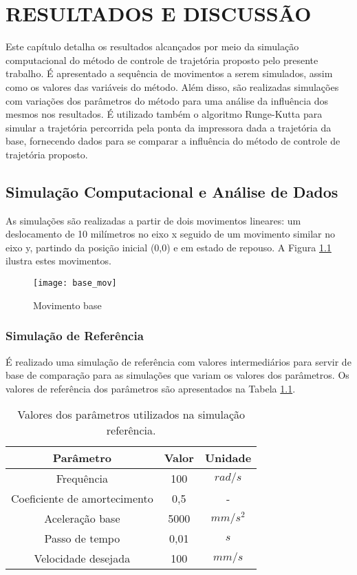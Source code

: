 \chapter{RESULTADOS E DISCUSSÃO}
Este capítulo detalha os resultados alcançados por meio da simulação computacional do método de controle de trajetória proposto pelo presente trabalho. É apresentado a sequência de movimentos a serem simulados, assim como os valores das variáveis do método. Além disso, são realizadas simulações com variações dos parâmetros do método para uma análise da influência dos mesmos nos resultados. É utilizado também o algoritmo Runge-Kutta para simular a trajetória percorrida pela ponta da impressora dada a trajetória da base, fornecendo dados para se comparar a influência do método de controle de trajetória proposto.

\section{Simulação Computacional e Análise de Dados}

As simulações são realizadas a partir de dois movimentos lineares: um deslocamento de 10 milímetros no eixo x seguido de um movimento similar no eixo y, partindo da posição inicial (0,0) e em estado de repouso. A Figura \ref{fig:base_mov} ilustra estes movimentos.

\begin{figure}[H]
    \centering
    \caption{Movimento base}
    \texttt{[image: base\_mov]}

    \label{fig:base_mov}
\end{figure}

\subsection{Simulação de Referência} 
É realizado uma simulação de referência com valores intermediários para servir de base de comparação para as simulações que variam os valores dos parâmetros. Os valores de referência dos parâmetros são apresentados na Tabela \ref{tab:base_params}.

\begin{table}
    \begin{center}
    \caption{Valores dos parâmetros utilizados na simulação referência.}
    \label{tab:base_params}
    \begin{tabular}{c c c}
        Parâmetro & Valor & Unidade\\ \hline
        Frequência & 100 & $rad/s$\\
        Coeficiente de amortecimento & 0,5 & - \\
        Aceleração base & 5000 & $mm/s^2$ \\
        Passo de tempo & 0,01 & $s$ \\ 
        Velocidade desejada & 100 & $mm/s$ \\ \hline
    \end{tabular}
    \end{center}
\end{table}

